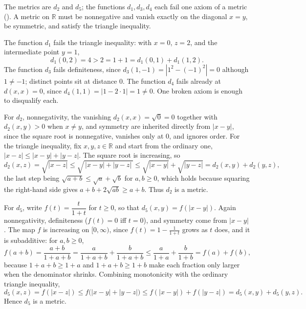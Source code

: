 \documentclass[main.tex]{subfiles}
\begin{document}
\begin{SolutionBlue}
The metrics are $d_{2}$ and $d_{5}$; the functions $d_{1},d_{3},d_{4}$ each fail one axiom of a metric
(). A metric on $\mathbb R$ must be nonnegative and vanish exactly on the diagonal
$x=y$, be symmetric, and satisfy the triangle inequality.

The function $d_{1}$ fails the triangle inequality: with $x=0$, $z=2$, and the intermediate point
$y=1$,
\[
d_{1}(0,2)=4>2=1+1=d_{1}(0,1)+d_{1}(1,2).
\]
The function $d_{3}$ fails definiteness, since $d_{3}(1,-1)=|1^{2}-(-1)^{2}|=0$ although $1\neq-1$;
distinct points sit at distance $0$. The function $d_{4}$ fails already at $d(x,x)=0$, since
$d_{4}(1,1)=|1-2\cdot 1|=1\neq 0$. One broken axiom is enough to disqualify each.

For $d_{2}$, nonnegativity, the vanishing $d_{2}(x,x)=\sqrt{0}=0$ together with $d_{2}(x,y)>0$ when
$x\neq y$, and symmetry are inherited directly from $|x-y|$, since the square root is nonnegative,
vanishes only at $0$, and ignores order. For the triangle inequality, fix $x,y,z\in\mathbb R$ and start
from the ordinary one, $|x-z|\le|x-y|+|y-z|$. The square root is increasing, so
\[
d_{2}(x,z)=\sqrt{|x-z|}\le\sqrt{\,|x-y|+|y-z|\,}\le\sqrt{|x-y|}+\sqrt{|y-z|}=d_{2}(x,y)+d_{2}(y,z),
\]
the last step being $\sqrt{a+b}\le\sqrt a+\sqrt b$ for $a,b\ge 0$, which holds because squaring the
right-hand side gives $a+b+2\sqrt{ab}\ge a+b$. Thus $d_{2}$ is a metric.

For $d_{5}$, write $f(t)=\dfrac{t}{1+t}$ for $t\ge 0$, so that $d_{5}(x,y)=f(|x-y|)$. Again
nonnegativity, definiteness ($f(t)=0$ iff $t=0$), and symmetry come from $|x-y|$. The map $f$ is
increasing on $[0,\infty)$, since $f(t)=1-\frac{1}{1+t}$ grows as $t$ does, and it is subadditive: for
$a,b\ge 0$,
\[
f(a+b)=\frac{a+b}{1+a+b}=\frac{a}{1+a+b}+\frac{b}{1+a+b}
\le\frac{a}{1+a}+\frac{b}{1+b}=f(a)+f(b),
\]
because $1+a+b\ge 1+a$ and $1+a+b\ge 1+b$ make each fraction only larger when the denominator shrinks.
Combining monotonicity with the ordinary triangle inequality,
\[
d_{5}(x,z)=f(|x-z|)\le f\bigl(|x-y|+|y-z|\bigr)\le f(|x-y|)+f(|y-z|)=d_{5}(x,y)+d_{5}(y,z).
\]
Hence $d_{5}$ is a metric.
\end{SolutionBlue}
\end{document}
